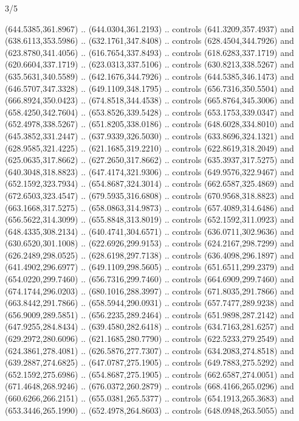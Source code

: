 \begin{flagdescription}{3/5}
\begin{scope}[xshift=0.5\flaglength]
\begin{scope}[scale=0.00167\flagwidth,yshift=210.9mm,xshift=-175.8mm]
\begin{scope}[y=-1pt, x=1pt]
  (644.5385,361.8967) .. (644.0304,361.2193) .. controls (641.3209,357.4937) and
  (638.6113,353.5986) .. (632.1761,347.8408) .. controls (628.4504,344.7926) and
  (623.8780,341.4056) .. (616.7654,337.8493) .. controls (618.6283,337.1719) and
  (620.6604,337.1719) .. (623.0313,337.5106) .. controls (630.8213,338.5267) and
  (635.5631,340.5589) .. (642.1676,344.7926) .. controls (644.5385,346.1473) and
  (646.5707,347.3328) .. (649.1109,348.1795) .. controls (656.7316,350.5504) and
  (666.8924,350.0423) .. (674.8518,344.4538) .. controls (665.8764,345.3006) and
  (658.4250,342.7604) .. (653.8526,339.5428) .. controls (653.1753,339.0347) and
  (652.4978,338.5267) .. (651.8205,338.0186) .. controls (648.6028,334.8010) and
  (645.3852,331.2447) .. (637.9339,326.5030) .. controls (633.8696,324.1321) and
  (628.9585,321.4225) .. (621.1685,319.2210) .. controls (622.8619,318.2049) and
  (625.0635,317.8662) .. (627.2650,317.8662) .. controls (635.3937,317.5275) and
  (640.3048,318.8823) .. (647.4174,321.9306) .. controls (649.9576,322.9467) and
  (652.1592,323.7934) .. (654.8687,324.3014) .. controls (662.6587,325.4869) and
  (672.6503,323.4547) .. (679.5935,316.6808) .. controls (670.9568,318.8823) and
  (663.1668,317.5275) .. (658.0863,314.9873) .. controls (657.4089,314.6486) and
  (656.5622,314.3099) .. (655.8848,313.8019) .. controls (652.1592,311.0923) and
  (648.4335,308.2134) .. (640.4741,304.6571) .. controls (636.0711,302.9636) and
  (630.6520,301.1008) .. (622.6926,299.9153) .. controls (624.2167,298.7299) and
  (626.2489,298.0525) .. (628.6198,297.7138) .. controls (636.4098,296.1897) and
  (641.4902,296.6977) .. (649.1109,298.5605) .. controls (651.6511,299.2379) and
  (654.0220,299.7460) .. (656.7316,299.7460) .. controls (664.6909,299.7460) and
  (674.1744,296.0203) .. (680.1016,288.3997) .. controls (671.8035,291.7866) and
  (663.8442,291.7866) .. (658.5944,290.0931) .. controls (657.7477,289.9238) and
  (656.9009,289.5851) .. (656.2235,289.2464) .. controls (651.9898,287.2142) and
  (647.9255,284.8434) .. (639.4580,282.6418) .. controls (634.7163,281.6257) and
  (629.2972,280.6096) .. (621.1685,280.7790) .. controls (622.5233,279.2549) and
  (624.3861,278.4081) .. (626.5876,277.7307) .. controls (634.2083,274.8518) and
  (639.2887,274.6825) .. (647.0787,275.1905) .. controls (649.7883,275.5292) and
  (652.1592,275.6986) .. (654.8687,275.1905) .. controls (662.6587,274.0051) and
  (671.4648,268.9246) .. (676.0372,260.2879) .. controls (668.4166,265.0296) and
  (660.6266,266.2151) .. (655.0381,265.5377) .. controls (654.1913,265.3683) and
  (653.3446,265.1990) .. (652.4978,264.8603) .. controls (648.0948,263.5055) and

\end{scope}
\end{scope}
\end{scope}
\end{flagdescription}
